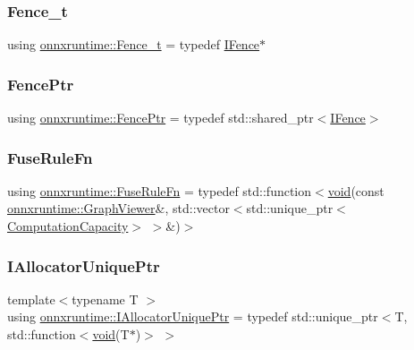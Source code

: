 \subsubsection{\texorpdfstring{Fence\+\_\+t}{Fence\_t}}
{\footnotesize\ttfamily using \mbox{\hyperlink{namespaceonnxruntime_a71ef3c4da6339a3625cdf4c4937e4913}{onnxruntime\+::\+Fence\+\_\+t}} = typedef \mbox{\hyperlink{classonnxruntime_1_1IFence}{I\+Fence}}$\ast$}

\mbox{\label{namespaceonnxruntime_a42d52aa37e4dba8c02178f81eda99eeb}} 
\subsubsection{\texorpdfstring{Fence\+Ptr}{FencePtr}}
{\footnotesize\ttfamily using \mbox{\hyperlink{namespaceonnxruntime_a42d52aa37e4dba8c02178f81eda99eeb}{onnxruntime\+::\+Fence\+Ptr}} = typedef std\+::shared\+\_\+ptr$<$\mbox{\hyperlink{classonnxruntime_1_1IFence}{I\+Fence}}$>$}

\mbox{\label{namespaceonnxruntime_a916d9c71f5b38a56c21340f816954b88}} 
\subsubsection{\texorpdfstring{Fuse\+Rule\+Fn}{FuseRuleFn}}
{\footnotesize\ttfamily using \mbox{\hyperlink{namespaceonnxruntime_a916d9c71f5b38a56c21340f816954b88}{onnxruntime\+::\+Fuse\+Rule\+Fn}} = typedef std\+::function$<$\mbox{\hyperlink{mlasi_8h_a88f941d423cb2a819b70a1358982b1a6}{void}}(const \mbox{\hyperlink{classonnxruntime_1_1GraphViewer}{onnxruntime\+::\+Graph\+Viewer}}\&, std\+::vector$<$std\+::unique\+\_\+ptr$<$\mbox{\hyperlink{structonnxruntime_1_1ComputationCapacity}{Computation\+Capacity}}$>$ $>$\&)$>$}

\mbox{\label{namespaceonnxruntime_a323aace024f171700e4b07b299a178e7}} 
\subsubsection{\texorpdfstring{I\+Allocator\+Unique\+Ptr}{IAllocatorUniquePtr}}
{\footnotesize\ttfamily template$<$typename T $>$ \\
using \mbox{\hyperlink{namespaceonnxruntime_a323aace024f171700e4b07b299a178e7}{onnxruntime\+::\+I\+Allocator\+Unique\+Ptr}} = typedef std\+::unique\+\_\+ptr$<$T, std\+::function$<$\mbox{\hyperlink{mlasi_8h_a88f941d423cb2a819b70a1358982b1a6}{void}}(T$\ast$)$>$ $>$}

